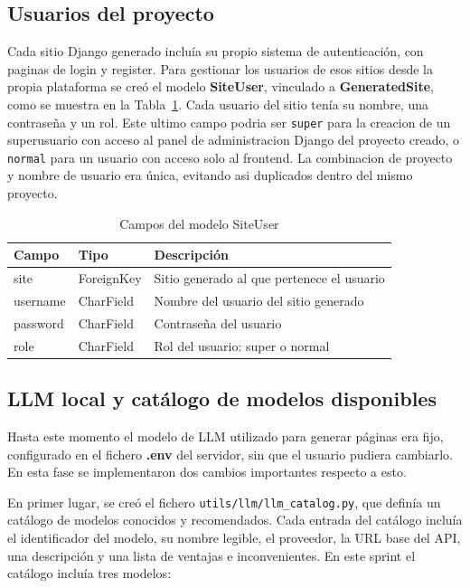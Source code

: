 \subsection{Usuarios del proyecto}
\label{subsec:usuarios-proyecto}


Cada sitio Django generado incluía su propio sistema de autenticación, con paginas de login y register. Para gestionar los usuarios de esos sitios desde la propia plataforma se creó el modelo \textbf{SiteUser}, vinculado a \textbf{GeneratedSite}, como se muestra en la Tabla~\ref{tab:modelo-siteuser}. Cada usuario del sitio tenía su nombre, una contraseña y un rol. Este ultimo campo podria ser \texttt{super} para la creacion de un superusuario con acceso al panel de administracion Django del proyecto creado, o \texttt{normal} para un usuario con acceso solo al frontend. La combinacion de proyecto y nombre de usuario era única, evitando asi duplicados dentro del mismo proyecto.

\begin{table}[H]
    \centering
    \begin{tabular}{|l|l|p{8cm}|}
        \hline
        \textbf{Campo} & \textbf{Tipo} & \textbf{Descripción} \\
        \hline
        site & ForeignKey & Sitio generado al que pertenece el usuario \\
        \hline
        username & CharField & Nombre del usuario del sitio generado \\
        \hline
        password & CharField & Contraseña del usuario \\
        \hline
        role & CharField & Rol del usuario: super o normal \\
        \hline
    \end{tabular}
    \caption{Campos del modelo SiteUser}
    \label{tab:modelo-siteuser}
\end{table}

\subsection{LLM local y catálogo de modelos disponibles}
\label{subsec:llm-local-catalogo-modelos}

Hasta este momento el modelo de LLM utilizado para generar páginas era fijo, configurado en el fichero \textbf{.env} del servidor, sin que el usuario pudiera cambiarlo. En esta fase se implementaron dos cambios importantes respecto a esto.

En primer lugar, se creó el fichero \texttt{utils/llm/llm\_catalog.py}, que definía un catálogo de modelos conocidos y recomendados. Cada entrada del catálogo incluía el identificador del modelo, su nombre legible, el proveedor, la URL base del API, una descripción y una lista de ventajas e inconvenientes. En este sprint el catálogo incluía tres modelos:

